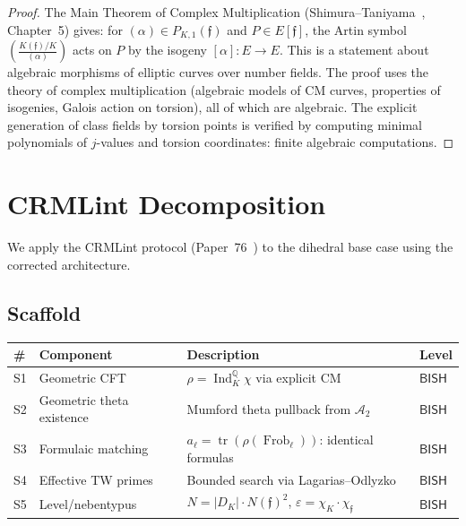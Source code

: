 \documentclass[11pt,a4paper]{article}
\theoremstyle{plain}
\theoremstyle{definition}
\newcommand{\BISH}{\textsf{BISH}}
\newcommand{\Q}{\mathbb{Q}}
\DeclareMathOperator{\tr}{tr}
\DeclareMathOperator{\Ind}{Ind}
\DeclareMathOperator{\Frob}{Frob}
\begin{document}
\begin{proof}
The Main Theorem of Complex Multiplication (Shimura--Taniyama~\cite{shimura-taniyama61}, Chapter~5) gives:
for $(\alpha) \in P_{K,1}(\mathfrak{f})$ and $P \in E[\mathfrak{f}]$, the Artin symbol $\left(\frac{K(\mathfrak{f})/K}{(\alpha)}\right)$ acts on $P$ by the isogeny $[\alpha] : E \to E$.
This is a statement about algebraic morphisms of elliptic curves over number fields.
The proof uses the theory of complex multiplication (algebraic models of CM curves, properties of isogenies, Galois action on torsion), all of which are algebraic.
The explicit generation of class fields by torsion points is verified by computing minimal polynomials of $j$-values and torsion coordinates: finite algebraic computations.
\end{proof}


\section{CRMLint Decomposition}\label{sec:crmlint}

We apply the CRMLint protocol (Paper~76~\cite{lee-p76}) to the dihedral base case using the corrected architecture.

\subsection{Scaffold}

\begin{center}
\begin{tabular}{@{}llp{6cm}l@{}}
\toprule
\textbf{\#} & \textbf{Component} & \textbf{Description} & \textbf{Level} \\
\midrule
S1 & Geometric CFT & $\rho = \Ind_K^\Q \chi$ via explicit CM & $\BISH$ \\
S2 & Geometric theta existence & Mumford theta pullback from $\mathcal{A}_2$ & $\BISH$ \\
S3 & Formulaic matching & $a_\ell = \tr(\rho(\Frob_\ell))$: identical formulas & $\BISH$ \\
S4 & Effective TW primes & Bounded search via Lagarias--Odlyzko & $\BISH$ \\
S5 & Level/nebentypus & $N = |D_K| \cdot N(\mathfrak{f})^2$, $\varepsilon = \chi_K \cdot \chi_\mathfrak{f}$ & $\BISH$ \\
\bottomrule
\end{tabular}
\end{center}
\end{document}
